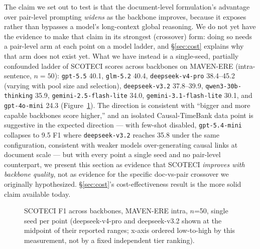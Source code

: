 \documentclass[11pt]{article}
\newcommand{\method}{SCOTECI}
\begin{document}
The claim we set out to test is that the document-level formulation's advantage
over pair-level prompting \emph{widens} as the backbone improves, because it
exposes rather than bypasses a model's long-context global reasoning. We do not
yet have the evidence to make that claim in its strongest (crossover) form: doing
so needs a pair-level arm at each point on a model ladder, and \S\ref{sec:cost}
explains why that arm does not exist yet. What we have instead is a single-seed,
partially confounded ladder of \method{} scores across backbones on MAVEN-ERE
(intra-sentence, $n=50$): \texttt{gpt-5.5} 40.1, \texttt{glm-5.2} 40.4,
\texttt{deepseek-v4-pro} 38.4--45.2 (varying with pool size and selection),
\texttt{deepseek-v3.2} 37.8--39.9, \texttt{qwen3-30b-thinking} 35.9,
\texttt{gemini-2.5-flash-lite} 34.0, \texttt{gemini-3.1-flash-lite} 30.1, and
\texttt{gpt-4o-mini} 24.3 (Figure~\ref{fig:ladder}). The direction is consistent
with ``bigger and more capable backbones score higher,'' and an isolated
Causal-TimeBank data point is suggestive in the expected direction --- with
few-shot disabled, \texttt{gpt-5.4-mini} collapses to 9.5 F1 where
\texttt{deepseek-v3.2} reaches 35.8 under the same configuration, consistent with
weaker models over-generating causal links at document scale --- but with every
point a single seed and no pair-level counterpart, we present this section as
evidence that \method{} \emph{improves with backbone quality}, not as evidence for
the specific doc-vs-pair crossover we originally hypothesized. \S\ref{sec:cost}'s
cost-effectiveness result is the more solid claim available today.

\begin{figure}[t]
  \centering
  \caption{\method{} F1 across backbones, MAVEN-ERE intra, $n$=50, single seed
  per point (deepseek-v4-pro and deepseek-v3.2 shown at the midpoint of their
  reported ranges; x-axis ordered low-to-high by this measurement, not by a
  fixed independent tier ranking).}
  \label{fig:ladder}
\end{figure}
\end{document}
